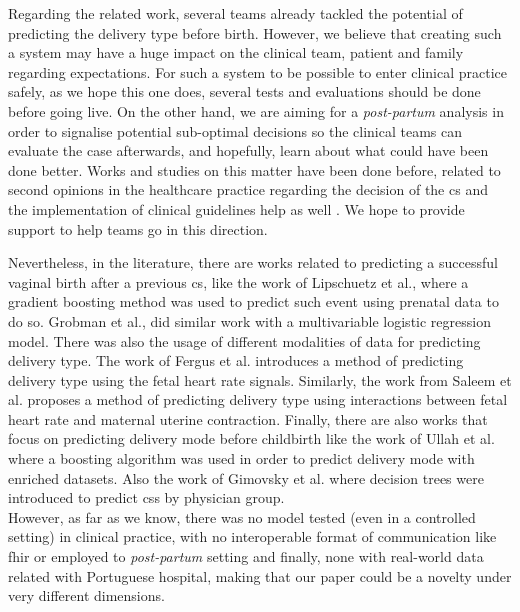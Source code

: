 Regarding the related work, several teams already tackled the potential of predicting the delivery type before birth. However, we believe that creating such a system may have a huge impact on the clinical team, patient and family regarding expectations. For such a system to be possible to enter clinical practice safely, as we hope this one does, several tests and evaluations should be done before going live.
On the other hand, we are aiming for a \textit{post-partum} analysis in order to signalise potential sub-optimal decisions so the clinical teams can evaluate the case afterwards, and hopefully, learn about what could have been done better.
Works and studies on this matter have been done before, related to second opinions in the healthcare practice regarding the decision of the \ac{cs} \cite{mandatorysecondopinion} and the implementation of clinical guidelines help as well \cite{reducingcaeresan}. We hope to provide support to help teams go in this direction.

Nevertheless, in the literature, there are works related to predicting a successful vaginal birth after a previous \ac{cs}, like the work of Lipschuetz et al., \cite{lipschuetzPredictionVaginalBirth2020} where a gradient boosting method was used to predict such event using prenatal data to do so. Grobman et al., \cite{grobman_development_2007} did similar work with a multivariable logistic regression model.
There was also the usage of different modalities of data for predicting delivery type. The work of Fergus et al. \cite{fergusClassificationCaesareanSection2017} introduces a method of predicting delivery type using the fetal heart rate signals. Similarly, the work from Saleem et al. \cite{saleemStrategyClassificationVaginal2019a} proposes a method of predicting delivery type using interactions between fetal heart rate and maternal uterine contraction.
Finally, there are also works that focus on predicting delivery mode before childbirth like the work of Ullah et al. \cite{ullah_reliable_2021} where a boosting algorithm was used in order to predict delivery mode with enriched datasets. Also the work of Gimovsky et al. \cite{gimovskyBenchmarkingCesareanDelivery} where decision trees were introduced  to predict \acp{cs} by physician group. \\
However, as far as we know, there was no model tested (even in a controlled setting) in clinical practice, with no interoperable format of communication like \ac{fhir} or employed to \textit{post-partum} setting and finally, none with real-world data related with Portuguese hospital, making that our paper could be a novelty under very different dimensions.

